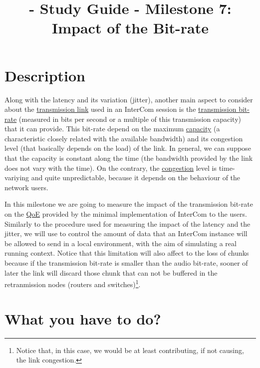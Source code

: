 
\title{\TM - Study Guide - Milestone 7: Impact of the Bit-rate}

\maketitle

\section{Description}

Along with the latency and its variation (jitter), another main aspect
to consider about the
\href{https://en.wikipedia.org/wiki/Telecommunications_link}{transmission
  link} used in an InterCom session is the
\href{https://en.wikipedia.org/wiki/Bit_rate}{transmission bit-rate}
(measured in bits per second or a multiple of this transmission
capacity) that it can provide. This bit-rate depend on the maximum
\href{https://en.wikipedia.org/wiki/Bandwidth_(computing)}{capacity}
(a characteristic closely related with the available bandwidth) and
its congestion level (that basically depends on the load) of the
link. In general, we can suppose that the capacity is constant along
the time (the bandwidth provided by the link does not vary with the
time). On the contrary, the
\href{https://en.wikipedia.org/wiki/Network_congestion}{congestion}
level is time-variying and quite unpredictable, because it depends on
the behaviour of the network users.

In this milestone we are going to measure the impact of the
transmission bit-rate on the
\href{https://en.wikipedia.org/wiki/Quality_of_experience}{QoE}
provided by the minimal implementation of InterCom to the
users. Similarly to the procedure used for measuring the impact of the
latency and the jitter, we will use
\href{https://man7.org/linux/man-pages/man8/tc.8.html}{} to
control the amount of data that an InterCom instance will be allowed
to send in a local environment, with the aim of simulating a real
running context. Notice that this limitation will also affect to the loss of
chunks because if the transmission bit-rate is smaller than the audio
bit-rate, sooner of later the link will discard those chunk that can
not be buffered in the retranmission nodes (routers and
switches)\footnote{Notice that, in this case, we would be at least
  contributing, if not causing, the link congestion.}.

\section{What you have to do?}

